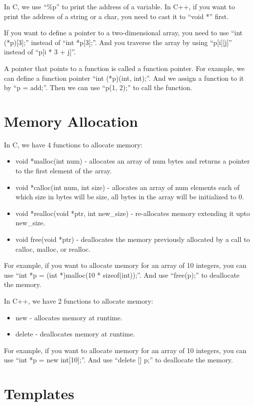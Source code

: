 \documentclass[a4paper,12pt]{article}
\begin{document}
In C, we use ``\%p'' to print the address of a variable.
In C++, if you want to print the address of a string or a char, you need to cast it to ``void *'' first.

If you want to define a pointer to a two-dimensional array, you need to use ``int (*p)[3];'' instead of ``int *p[3];''.
And you traverse the array by using ``p[i][j]'' instead of ``p[i * 3 + j]''.

A pointer that points to a function is called a function pointer.
For example, we can define a function pointer ``int (*p)(int, int);''.
And we assign a function to it by ``p = add;''.
Then we can use ``p(1, 2);'' to call the function.
\section*{Memory Allocation}

In C, we have 4 functions to allocate memory: 
\begin{itemize}
	\item void *malloc(int num) - allocates an array of num bytes and returns a pointer to the first element of the array.
	\item void *calloc(int num, int size) - allocates an array of num elements each of which size in bytes will be size, all bytes in the array will be initialized to 0.
	\item void *realloc(void *ptr, int new\_size) - re-allocates memory extending it upto new\_size.
	\item void free(void *ptr) - deallocates the memory previously allocated by a call to calloc, malloc, or realloc.
\end{itemize}

For example, if you want to allocate memory for an array of 10 integers, you can use ``int *p = (int *)malloc(10 * sizeof(int));''.
And use ``free(p);'' to deallocate the memory.

In C++, we have 2 functions to allocate memory:
\begin{itemize}
	\item new - allocates memory at runtime.
	\item delete - deallocates memory at runtime.
\end{itemize}

For example, if you want to allocate memory for an array of 10 integers, you can use ``int *p = new int[10];''.
And use ``delete [] p;'' to deallocate the memory.

\section*{Templates}
\end{document}
